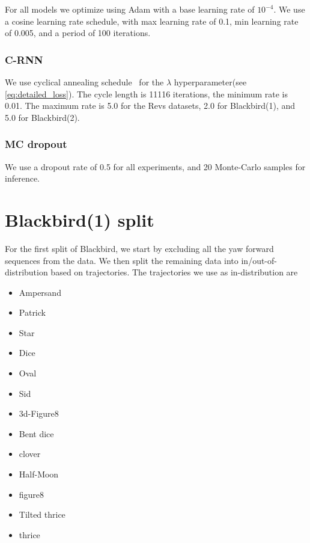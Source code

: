 For all models we optimize using  Adam with a base learning rate of $10^{-4}$. We use a cosine learning rate schedule, with max learning rate of 0.1, min learning rate of 0.005, and a period of 100 iterations. 

\subsubsection{C-RNN}

We use cyclical annealing schedule~\citep{liu2019cyclical} for the $\lambda$ hyperparameter(see \cref{eq:detailed_loss}). The cycle length is 11116 iterations, the minimum rate is 0.01. The maximum rate is 5.0 for the Revs datasets,  2.0 for Blackbird(1), and 5.0 for Blackbird(2).

\subsubsection{MC dropout}

We use a dropout rate of 0.5 for all experiments, and 20 Monte-Carlo samples for inference. 






\clearpage
\section{Blackbird(1) split}
\label{app:blkbrd_split}

For the first split of Blackbird, we start by excluding all the yaw forward sequences from the data. We then split the remaining data into in/out-of-distribution based on trajectories. The trajectories we use as in-distribution are
\begin{multicols}{2}
\begin{itemize}
    \item Ampersand 
    \item Patrick
    \item Star
    \item Dice
    \item Oval
    \item Sid
    \item 3d-Figure8
    \item Bent dice
    \item clover
    \item Half-Moon
    \item figure8
    \item Tilted thrice
    \item thrice
\end{itemize}{}
\end{multicols}
